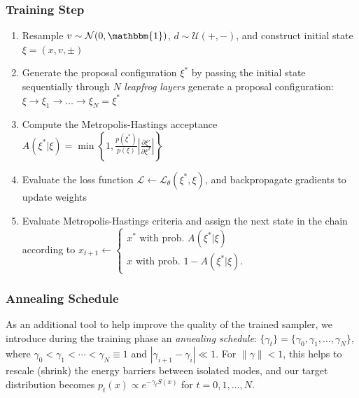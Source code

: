 \documentclass[a4paper,11pt]{article}
\begin{document}
\subsubsection{\label{subsubsec:trainstep}Training Step}
%
\begin{enumerate}
    \item Resample \(v \sim \mathcal{N} (0, \mathbbm{1})\),
        \(d \sim \mathcal{U} (+, -)\), and construct initial state
        \(\xi = (x, v, \pm)\)
    \item Generate the proposal configuration \(\xi^{\ast}\) by passing the
        initial state sequentially through \(N\) \emph{leapfrog
        layers }%
        generate a proposal configuration: \(\xi \rightarrow \xi_{1}
        \rightarrow \ldots \rightarrow \xi_{N} = \xi^{\ast}\)
    \item Compute the Metropolis-Hastings acceptance \(A(\xi^{\ast} | \xi) =
        \min\left\{1, \frac{p(\xi^{\ast})}{p(\xi)}\left|\frac{\partial
        \xi'}{\partial \xi^{T}} \right| \right\}\)
    \item Evaluate the loss function \(\mathcal{L} \leftarrow
        \mathcal{L}_{\theta}(\xi^{\ast}, \xi)\), and backpropagate gradients to
        update weights
    \item Evaluate Metropolis-Hastings criteria and assign the next state in
        the chain according to
        \(x_{t+1} \leftarrow \begin{cases}%
            x^{\ast} \text{ with prob. } A(\xi^{\ast}|\xi) \\
            x \text{ with prob. } 1 - A(\xi^{\ast}|\xi).
        \end{cases}\)
\end{enumerate}
%
\subsubsection{\label{subsubsec:annealing}Annealing Schedule}
As an additional tool to help improve the quality of the trained sampler, we
introduce during the training phase an \emph{annealing schedule}:
\(\{\gamma_{t}\} = \{\gamma_{0}, \gamma_{1}, \ldots, \gamma_{N}\}\), where \(\gamma_{0} < \gamma_{1} < \cdots < \gamma_{N} \equiv 1\) and \(|\gamma_{i+1} - \gamma_{i}| \ll 1\).
%
For \(\|\gamma\| < 1\), this helps to rescale (shrink) the energy barriers
between isolated modes, and our target distribution becomes \(p_{t}(x) \propto
e^{-\gamma_{t} S(x)}\) for \(t = 0, 1, \ldots, N\).
%
\end{document}
